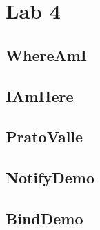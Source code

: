 	\section{Lab 4}

	\subsection{WhereAmI}

	\subsection{IAmHere}

	\subsection{PratoValle}

	\subsection{NotifyDemo}

	\subsection{BindDemo}
